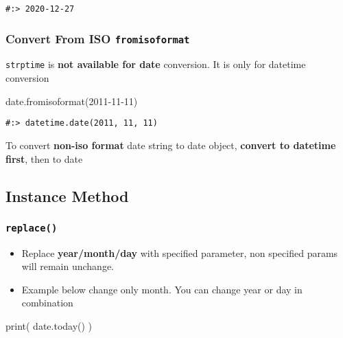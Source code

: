 \documentclass[
]{book}
\newenvironment{Shaded}{\begin{snugshade}}{\end{snugshade}}
\newcommand{\BuiltInTok}[1]{#1}
\newcommand{\NormalTok}[1]{#1}
\newcommand{\StringTok}[1]{\textcolor[rgb]{0.5,0.5,0.5}{#1}}
\providecommand{\tightlist}{%
  \setlength{\itemsep}{0pt}\setlength{\parskip}{0pt}}
\begin{document}
\begin{verbatim}
#:> 2020-12-27
\end{verbatim}

\hypertarget{convert-from-iso-fromisoformat}{%
\subsubsection{\texorpdfstring{Convert From ISO \texttt{fromisoformat}}{Convert From ISO fromisoformat}}\label{convert-from-iso-fromisoformat}}

\texttt{strptime} is \textbf{not available for date} conversion. It is only for datetime conversion

\begin{Shaded}
\begin{Highlighting}[]
\NormalTok{date.fromisoformat(}\StringTok{\textquotesingle{}2011{-}11{-}11\textquotesingle{}}\NormalTok{)}
\end{Highlighting}
\end{Shaded}

\begin{verbatim}
#:> datetime.date(2011, 11, 11)
\end{verbatim}

To convert \textbf{non-iso format} date string to date object, \textbf{convert to datetime first}, then to date

\hypertarget{instance-method}{%
\subsection{Instance Method}\label{instance-method}}

\hypertarget{replace}{%
\subsubsection{\texorpdfstring{\texttt{replace()}}{replace()}}\label{replace}}

\begin{itemize}
\tightlist
\item
  Replace \textbf{year/month/day} with specified parameter, non specified params will remain unchange.\\
\item
  Example below change only month. You can change year or day in combination
\end{itemize}

\begin{Shaded}
\begin{Highlighting}[]
\BuiltInTok{print}\NormalTok{( date.today() )}
\end{Highlighting}
\end{Shaded}
\end{document}
